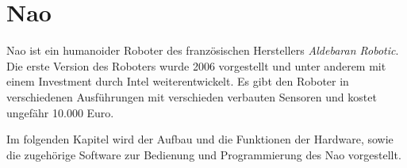\chapter{Nao}\label{c:nao}
Nao ist ein humanoider Roboter des französischen Herstellers \textit{Aldebaran Robotic}. Die erste Version des Roboters wurde 2006 vorgestellt und unter anderem mit einem Investment durch Intel weiterentwickelt. Es gibt den Roboter in verschiedenen Ausführungen mit verschieden verbauten Sensoren und kostet ungefähr 10.000 Euro. \cite{ws:wikinao}

Im folgenden Kapitel wird der Aufbau und die Funktionen der Hardware, sowie die zugehörige Software zur Bedienung und Programmierung des Nao vorgestellt.




